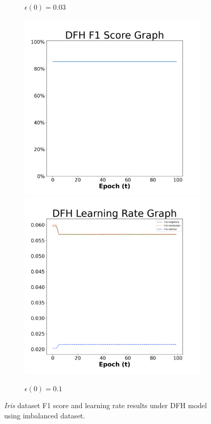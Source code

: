 \begin{figure}[H]
\begin{subfigure}{0.3\textwidth}
  \caption{$\epsilon(0)=0.03$}
\end{subfigure}\hfil %
\begin{subfigure}{0.3\textwidth}
  \includegraphics[width=\linewidth]{images/exper2/iris/DFH_0.1_f1.png}
  \includegraphics[width=\linewidth]{images/exper2/iris/DFH_0.1_lr.png}
  \caption{$\epsilon(0)=0.1$}
\end{subfigure}

\caption{\textit{Iris} dataset F1 score and learning rate results under DFH model using imbalanced dataset.}
\end{figure}

